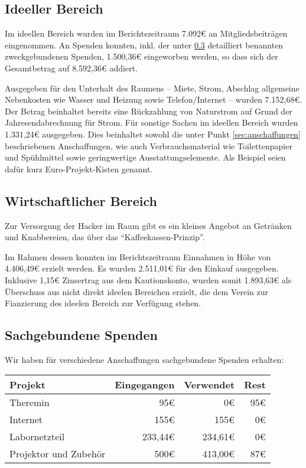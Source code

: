 \documentclass[10pt,DIV16]{scrartcl}
\begin{document}
\subsection{Ideeller Bereich}
\label{sec:ideeller_bereich}

Im ideellen Bereich wurden im Berichtszeitraum 7.092\euro{} an 
Mitgliedsbeiträgen eingenommen. An Spenden konnten, inkl. der unter 
\ref{sec:sachegebundene_spenden} detailliert benannten zweckgebundenen 
Spenden, 1.500,36\euro{} eingeworben werden, so dass sich der 
Gesamtbetrag auf 8.592,36\euro{} addiert.

Ausgegeben für den Unterhalt des Raumens -- Miete, Strom, Abschlag 
allgemeine Nebenkosten wie Wasser und Heizung sowie Telefon/Internet -- 
wurden 7.152,68\euro{}. Der Betrag beinhaltet bereits eine Rückzahlung 
von Naturstrom auf Grund der Jahresendabrechnung für Strom. Für 
sonstige Sachen im ideellen Bereich wurden 1.331,24\euro{} ausgegeben. 
Dies beinhaltet sowohl die unter Punkt \ref{sec:anschaffungen} beschriebenen 
Anschaffungen, wie auch Verbrauchsmaterial wie Toilettenpapier und 
Spühlmittel sowie geringwertige Ausstattungselemente. Als Beispiel 
seien dafür kurz Euro-Projekt-Kisten genannt. 


\subsection{Wirtschaftlicher Bereich}
\label{sec:wirschaftlicher_bereich}

Zur Versorgung der Hacker im Raum gibt es ein kleines Angebot an
Getränken und Knabbereien, das über das "`Kaffeekassen-Prinzip"'.

Im Rahmen dessen konnten im Berichtszeitraum Einnahmen in Höhe von 
4.406,49\euro{} erzielt werden. Es wurden 2.511,01\euro{} für den Einkauf 
ausgegeben. Inklusive 1,15\euro{} Zinsertrag aus dem Kautionskonto, 
wurden somit 1.893,63\euro{} als Überschuss aus nicht direkt ideelen 
Bereichen erzielt, die dem Verein zur Fianzierung des ideelen Bereich 
zur Verfügung stehen.

\subsection{Sachgebundene Spenden}
\label{sec:sachegebundene_spenden}
Wir haben für verschiedene Anschaffungen sachgebundene Spenden erhalten:

\begin{table}[h]
	\begin{tabular}{l|r|r|r}
	\textbf{Projekt} & \textbf{Eingegangen} & \textbf{Verwendet} & \textbf{Rest} \\ \hline
	Theremin & 95\euro & 0\euro & 95\euro \\
	Internet & 155\euro & 155\euro & 0\euro \\
	Labornetzteil & 233,44\euro & 234,61\euro & 0\euro{} \\
	Projektor und Zubehör & 500\euro & 413,00\euro & 87\euro \\
	\end{tabular}
\end{table}
\end{document}
